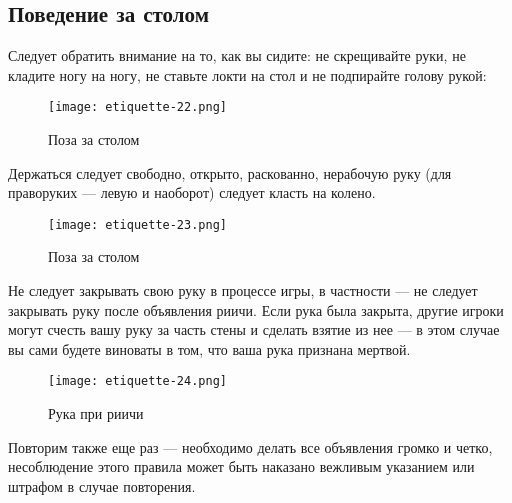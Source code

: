 \subsection{Поведение за столом}

Следует обратить внимание на то, как вы сидите: не скрещивайте руки, не кладите ногу на ногу, не ставьте локти на стол и не подпирайте голову рукой:

\begin{figure}[H]
	\centering
	\texttt{[image: etiquette-22.png]}
	\caption{Поза за столом}
\end{figure}

Держаться следует свободно, открыто, раскованно, нерабочую руку (для праворуких — левую и наоборот) следует класть на колено.

\begin{figure}[H]
	\centering
	\texttt{[image: etiquette-23.png]}
	\caption{Поза за столом}
\end{figure}

Не следует закрывать свою руку в процессе игры, в частности --- не следует закрывать руку после объявления риичи. Если рука была закрыта, другие игроки могут счесть вашу руку за часть стены и сделать взятие из нее --- в этом случае вы сами будете виноваты в том, что ваша рука признана мертвой.

\begin{figure}[H]
	\centering
	\texttt{[image: etiquette-24.png]}
	\caption{Рука при риичи}
\end{figure}

Повторим также еще раз --- необходимо делать все объявления громко и четко, несоблюдение этого правила может быть наказано вежливым указанием или штрафом в случае повторения.
